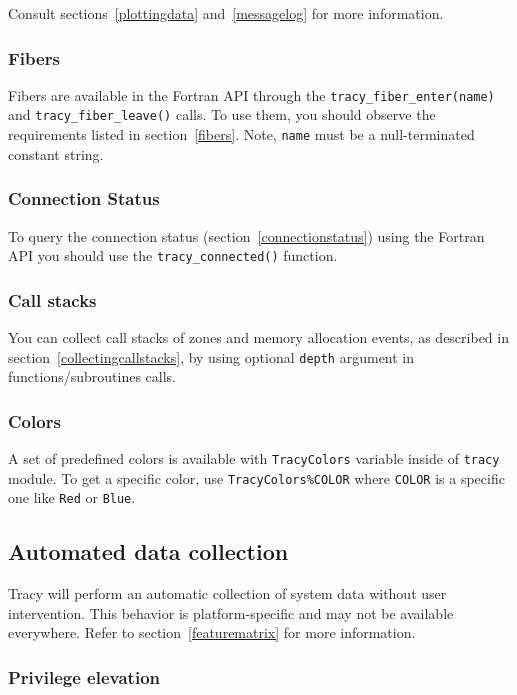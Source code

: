 \documentclass[hidelinks,titlepage,a4paper,twoside]{article}
\begin{document}
Consult sections~\ref{plottingdata} and~\ref{messagelog} for more information.

\subsubsection{Fibers}

Fibers are available in the Fortran API through the \texttt{tracy\_fiber\_enter(name)} and \texttt{tracy\_fiber\_leave()} calls. To use them, you should observe the requirements listed in section~\ref{fibers}.
Note, \texttt{name} must be a null-terminated constant string.

\subsubsection{Connection Status}

To query the connection status (section~\ref{connectionstatus}) using the Fortran API you should use the \texttt{tracy\_connected()} function.

\subsubsection{Call stacks}

You can collect call stacks of zones and memory allocation events, as described in section~\ref{collectingcallstacks}, by using optional \texttt{depth} argument in functions/subroutines calls.

\subsubsection{Colors}

A set of predefined colors is available with \texttt{TracyColors} variable inside of \texttt{tracy} module.
To get a specific color, use \texttt{TracyColors\%COLOR} where \texttt{COLOR} is a specific one like \texttt{Red} or \texttt{Blue}.


\subsection{Automated data collection}
\label{automated}

Tracy will perform an automatic collection of system data without user intervention. This behavior is platform-specific and may not be available everywhere. Refer to section~\ref{featurematrix} for more information.

\subsubsection{Privilege elevation}
\label{privilegeelevation}
\end{document}

